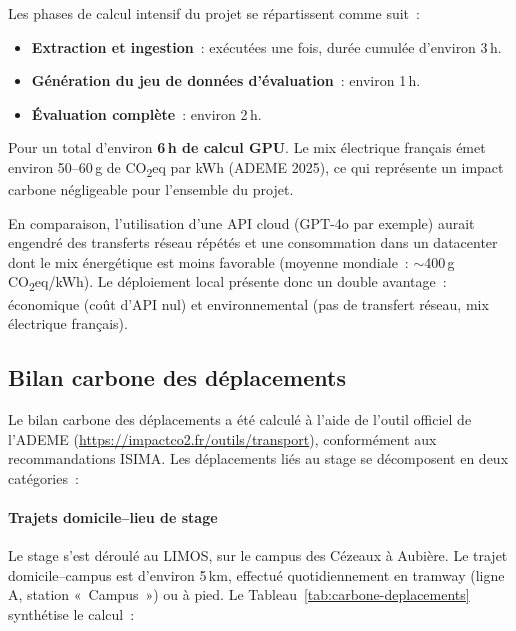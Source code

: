 \documentclass[11pt,a4paper]{article}
\begin{document}
Les phases de calcul intensif du projet se répartissent comme suit~:

\begin{itemize}
  \item \textbf{Extraction et ingestion}~: exécutées une fois, durée cumulée d'environ 3\,h.
  \item \textbf{Génération du jeu de données d'évaluation}~: environ 1\,h.
  \item \textbf{Évaluation complète}~: environ 2\,h.
\end{itemize}

Pour un total d'environ \textbf{6\,h de calcul GPU}. Le mix électrique français émet environ 50--60\,g de CO\textsubscript{2}eq par kWh (ADEME 2025), ce qui représente un impact carbone négligeable pour l'ensemble du projet.

En comparaison, l'utilisation d'une API cloud (GPT-4o par exemple) aurait engendré des transferts réseau répétés et une consommation dans un datacenter dont le mix énergétique est moins favorable (moyenne mondiale~: $\sim$400\,g CO\textsubscript{2}eq/kWh). Le déploiement local présente donc un double avantage~: économique (coût d'API nul) et environnemental (pas de transfert réseau, mix électrique français).

\subsection{Bilan carbone des déplacements}
\label{sec:bilan-carbone}

Le bilan carbone des déplacements a été calculé à l'aide de l'outil officiel de l'ADEME (\url{https://impactco2.fr/outils/transport}), conformément aux recommandations ISIMA. Les déplacements liés au stage se décomposent en deux catégories~:

\paragraph{Trajets domicile--lieu de stage}

Le stage s'est déroulé au LIMOS, sur le campus des Cézeaux à Aubière. Le trajet domicile--campus est d'environ 5\,km, effectué quotidiennement en tramway (ligne A, station «~Campus~») ou à pied. Le Tableau~\ref{tab:carbone-deplacements} synthétise le calcul~:
\end{document}
